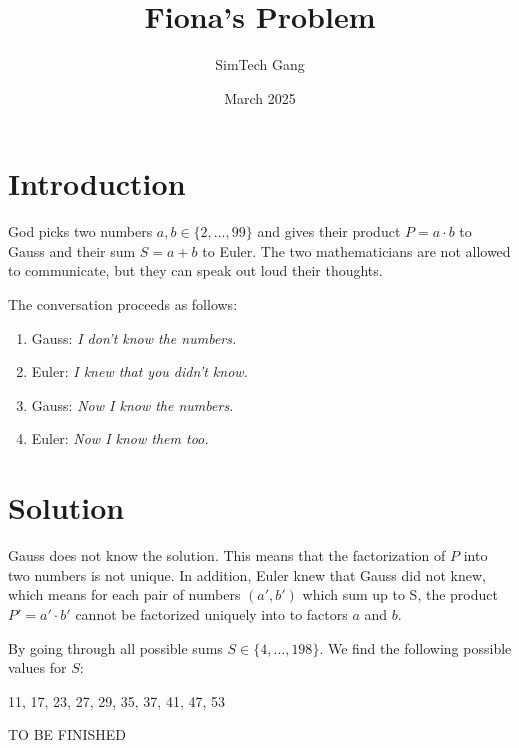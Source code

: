 \documentclass{article}
\title{Fiona's Problem}
\author{SimTech Gang}
\date{March 2025}
\begin{document}
\maketitle

\section{Introduction}
God picks two numbers $a,b \in \{2,\ldots,99\}$ and gives their product $P = a\cdot b$ to Gauss and their sum $S = a+b$ to Euler. The two mathematicians are not allowed to communicate, but they can speak out loud their thoughts.

The conversation proceeds as follows:
\begin{enumerate}
\item Gauss: \emph{I don't know the numbers.}
\item Euler: \emph{I knew that you didn't know.}
\item Gauss: \emph{Now I know the numbers.}
\item Euler: \emph{Now I know them too.}
\end{enumerate}

\section{Solution}
Gauss does not know the solution. This means that the factorization of $P$ into two numbers is not unique. In addition, Euler knew that Gauss did not knew, which means for each pair of numbers $(a',b')$ which sum up to S, the product $P' = a'\cdot b'$ cannot be factorized uniquely into to factors $a$ and $b$.

By going through all possible sums $S \in \{4,\ldots,198\}$. We find the following possible values for $S$:

11, 17, 23, 27, 29, 35, 37, 41, 47, 53

TO BE FINISHED
\end{document}
